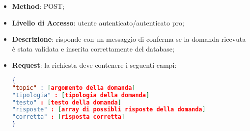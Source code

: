\begin{itemize}
\begin{itemize}
			\item \textbf{Method}: POST;
			\item \textbf{Livello di Accesso}: utente autenticato/autenticato pro;
			\item \textbf{Descrizione}: risponde con un messaggio di conferma se la domanda ricevuta è stata validata e inserita correttamente del database;
			\item \textbf{Request}: la richiesta deve contenere i seguenti campi:
\begin{lstlisting}[language=json,firstnumber=1]
{
"topic" : [argomento della domanda]
"tipologia" : [tipologia della domanda]
"testo" : [testo della domanda]
"risposte" : [array di possibli risposte della domanda]
"corretta" : [risposta corretta]
}
\end{lstlisting}
		\end{itemize}
\end{itemize}